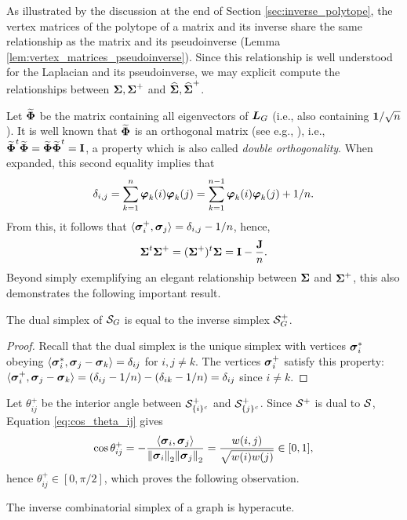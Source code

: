 As illustrated by the discussion at the end of Section \ref{sec:inverse_polytope}, the vertex matrices of the polytope of a matrix and its inverse share the same relationship as the matrix and its pseudoinverse (Lemma \ref{lem:vertex_matrices_pseudoinverse}). Since this relationship is well understood for the Laplacian and its pseudoinverse, we may explicit compute the relationships between $\boldsymbol{\Sigma},\boldsymbol{\Sigma}^+$ and $\widehat{\boldsymbol{\Sigma}},\widehat{\boldsymbol{\Sigma}}^+$. 

Let $\widetilde{\boldsymbol{\Phi}}$ be the matrix containing all eigenvectors of $\vb*{L}_G$ (i.e., also containing $\vb{1}/\sqrt{n}$).  It is well known that $\widetilde{\boldsymbol{\Phi}}$ is an orthogonal matrix (see e.g., \cite{van2013double}), i.e., $\widetilde{\boldsymbol{\Phi}}^t \widetilde{\boldsymbol{\Phi}}=\widetilde{\boldsymbol{\Phi}}\widetilde{\boldsymbol{\Phi}}^t=\vb{I}$, a property which is also called \emph{double orthogonality}. When expanded, this second equality implies that
\begin{equation}
\label{eq:sum_double_ortho}
\delta_{i,j}=\sum_{k=1}^n \vb*{\varphi}_k(i)\vb*{\varphi}_k(j) = \sum_{k=1}^{n-1} \vb*{\varphi}_k(i)\vb*{\varphi}_k(j) + 1/n.
\end{equation}
From this, it follows that $\langle\vb*{\sigma}_i^+,\vb*{\sigma}_j\rangle = \delta_{i,j} - 1/n$, 
hence, 
\begin{equation}
\label{eq:sv+sv}
    \boldsymbol{\Sigma}^t\boldsymbol{\Sigma}^+=(\boldsymbol{\Sigma}^+)^t\boldsymbol{\Sigma}=\vb{I}-\frac{\vb{J}}{n}.
\end{equation}
Beyond simply exemplifying an elegant relationship between $\boldsymbol{\Sigma}$ and $\boldsymbol{\Sigma}^+$, this also demonstrates the following important result. 

\begin{observation}
	\label{obs:inverse_is_dual}
	The dual simplex of $\mathcal{S}_G$ is equal to the inverse simplex $\mathcal{S}_G^+$. 
\end{observation}
\begin{proof}
	Recall that the dual simplex is the unique simplex with vertices $\vb*{\sigma}_i^*$ obeying $\langle \vb*{\sigma}_i^*,\vb*{\sigma}_j-\vb*{\sigma}_k\rangle = \delta_{ij}$ for $i,j\neq k$. The vertices $\vb*{\sigma}_i^+$ satisfy this property: $\langle \vb*{\sigma}_i^+,\vb*{\sigma}_j-\vb*{\sigma}_k\rangle = (\delta_{ij}-1/n) - (\delta_{ik} - 1/n) = \delta_{ij}$ since $i\neq k$. 
\end{proof}
Let $\theta^+_{ij}$ be the interior angle between $\mathcal{S}^+_{\{i\}^c}$ and $\mathcal{S}^+_{\{j\}^c}$. Since $\mathcal{S}^+$ is dual to $\mathcal{S}$, Equation \eqref{eq:cos_theta_ij} gives 
\[\cos\theta_{ij}^+ = - \frac{\langle \vb*{\sigma}_i,\vb*{\sigma}_j\rangle}{\norm{\vb*{\sigma}_i}_2\norm{\vb*{\sigma}_j}_2} = \frac{w(i,j)}{\sqrt{w(i)w(j)}}\in[0,1],\]
hence $\theta^+_{ij}\in[0,\pi/2]$, which proves the following observation. 

\begin{observation}
	\label{obs:S^+_hyperacute}
	The inverse combinatorial simplex of a graph is hyperacute. 
\end{observation}

